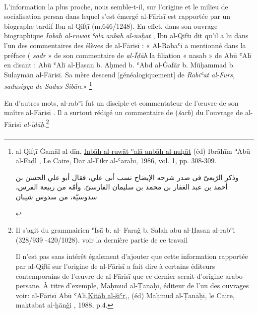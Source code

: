 \documentclass[a4paper,12pt]{report}
\begin{document}
\begin{itemize}
\paragraph{}
L’information la plus proche, nous semble-t-il, sur l’origine  et le milieu de socialisation persan dans lequel s’est émergé  al-Fārisī  est  rapportée par un biographe tardif Ibn al-Qifṭī  (m.646/1248). En effet, dans son ouvrage biographique \textit{Inbāh al-ruwāt ʿalā anbāh al-nuḥāt} , Ibn al-Qiftī dit qu’il a lu dans l'un des commentaires des élèves de al-Fārisī   : «  Al-Rabaʿī a mentionné dans la préface ( \textit{sadr} » de son commentaire de \textit{al-Īḍāh} la filiation « nasab » de Abū ʿAlī  en disant : Abū ʿAlī al-Ḥasan b. Aḥmed b. ʿAbd al-Ġafār b. Mūḥammad b. Sulaymān al-Fārisī. Sa mère descend [généalogiquement] de \textit{Rabiʿat al-Furs, sadusiyya de  Sadus Šibān}.» \footnote {  
al-Qifṭ\=i Ǧamāl al-dīn, \underline {Inbāh al-ruwāt ʿalā anbāh al-nuḥāt}  (éd) Ibrāhīm ʾAbū al-Faḍl , Le Caire, Dār al-Fikr al-ʿarabī, 1986, vol. 1, pp. 308-309.  
\begin{Arabic}
    
وذكر الرّبعىّ فى صدر شرحه الإيضاح نسب أبى علي، فقال أبو 
علي الحسن بن أحمد بن عبد الغفار بن محمد بن سليمان الفارسىّ. وأمّه من ربيعة الفرس، سدوسيّة، من سدوس شيبان

\end{Arabic}

}

En d’autres mots,  al-rabʿi  fut un disciple  et commentateur de l’œuvre de son maître al-Fārisī . Il a surtout rédigé un commentaire de  (\textit{šarh}) du l’ouvrage de al-Fārisī \textit{al-īḍāḥ}.\footnote{ Il s'agit du grammairien  ʿĪsā b. al- Faraǧ  b. Salah abu al-Ḥasan al-rabʿi  (328/939 -420/1028). 
 voir la dernière partie de ce travail 
 
 Il n’est pas sans intérêt également d’ajouter que cette information rapportée par al-Qif̣tī sur l’origine de al-Fārisī a fait dire à certains éditeurs contemporains de l’œuvre de al-Fārisī que ce dernier serait d’origine arabo-persane. À titre d’exemple, Maḥmud al-Ṭanāḥī, éditeur de l’un des ouvrages 
 voir:
 al-Fārisī Abū ʿAlī,\underline {Kitāb al-šiʿr,}, (éd) Maḥmud al-Ṭanāḥī, le Caire, maktabat al-ḫānǧi ,
 1988, p.4.
 }  
 
\paragraph{}


\end{itemize}
\end{document}
